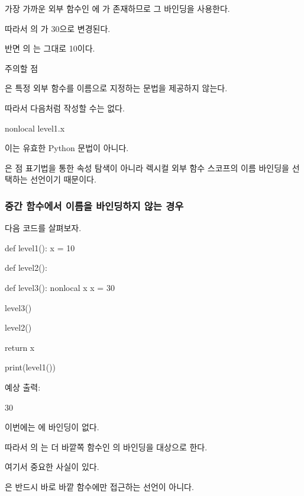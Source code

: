 가장 가까운 외부 함수인 에 가 존재하므로 그 바인딩을 사용한다.

따라서 의 가 30으로 변경된다.

반면 의 는 그대로 10이다.

\begin{dhknote}
\begin{dhksmry}[centered]
주의할 점
\end{dhksmry}
\end{dhknote}

은 특정 외부 함수를 이름으로 지정하는 문법을 제공하지 않는다.

따라서 다음처럼 작성할 수는 없다.

\begin{dhkcode}
nonlocal level1.x
\end{dhkcode}

이는 유효한 Python 문법이 아니다.

은 점 표기법을 통한 속성 탐색이 아니라 렉시컬 외부 함수 스코프의 이름 바인딩을 선택하는 선언이기 때문이다.

\subsubsection{중간 함수에서 이름을 바인딩하지 않는 경우}

다음 코드를 살펴보자.

\begin{dhkcode}
def level1():
    x = 10

    def level2():

        def level3():
            nonlocal x
            x = 30

        level3()

    level2()

    return x


print(level1())
\end{dhkcode}

예상 출력:

\begin{dhkzsh}
30
\end{dhkzsh}

이번에는 에  바인딩이 없다.

따라서 의 는 더 바깥쪽 함수인 의 바인딩을 대상으로 한다.

여기서 중요한 사실이 있다.

은 반드시 바로 바깥 함수에만 접근하는 선언이 아니다.

